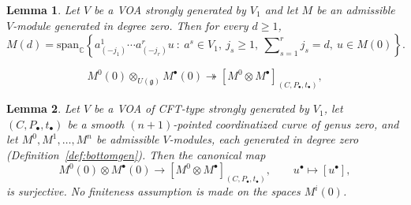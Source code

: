 \documentclass[10pt,a4paper]{amsart}
\newtheorem{lemma}{Lemma}
\newcommand{\C}{\mathbb{C}}
\def\ds{\dots}
\newcommand{\g}{\mathfrak{g}}
\def\o{\otimes}
\def\spn{\mathrm{span}}
\begin{document}
\begin{lemma}\label{lm:bottomgen}
Let $V$ be a VOA strongly generated by $V_1$ and let $M$ be an admissible
$V$-module generated in degree zero. Then for every $d\geq 1$,
\begin{equation}\label{eq:bottomgen}
M(d)=\spn_\C\left\{a^1_{(-j_1)}\cdots a^r_{(-j_r)}u\ :\ a^s\in V_1,\ j_s\geq 1,\ \sum\nolimits_{s=1}^r j_s=d,\ u\in M(0)\right\}.
\end{equation}
\end{lemma}

\begin{equation}\label{eq:gsurj}
M^0(0)\o_{U(\g)} M^\bullet (0)\twoheadrightarrow [M^0\o M^\bullet]_{(C,P_\bullet,t_\bullet)},
\end{equation}

\begin{lemma}\label{lm:DG1}
Let $V$ be a VOA of CFT-type strongly generated by $V_1$, let $(C,P_\bullet,t_\bullet)$
be a smooth $(n+1)$-pointed coordinatized curve of genus zero, and let
$M^0,M^1,\ds,M^n$ be admissible $V$-modules, each generated in degree zero
(Definition~\ref{def:bottomgen}). Then the canonical map
\[
M^0(0)\o M^\bullet(0)\longrightarrow [M^0\o M^\bullet]_{(C,P_\bullet,t_\bullet)},\qquad
u^\bullet\mapsto [u^\bullet],
\]
is surjective. No finiteness assumption is made on the spaces $M^i(0)$.
\end{lemma}
\end{document}
